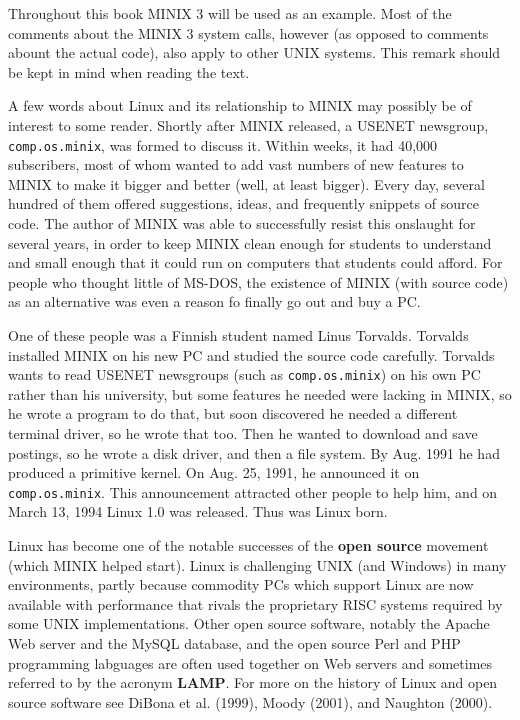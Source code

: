 \documentclass{book}
\newcommand {\kw}  [1] {\textbf{#1}}
\newcommand {\www} [1] {\texttt{#1}}
\begin{document}
Throughout this book MINIX 3 will be used as an example.
Most of the comments about the MINIX 3 system calls, however (as opposed to comments abount the actual code), also apply to other UNIX systems.
This remark should be kept in mind when reading the text.

A few words about Linux and its relationship to MINIX may possibly be of interest to some reader.
Shortly after MINIX released, a USENET newsgroup, \www{comp.os.minix}, was formed to discuss it.
Within weeks, it had 40,000 subscribers, most of whom wanted to add vast numbers of new features to MINIX 
to make it bigger and better (well, at least bigger).
Every day, several hundred of them offered suggestions, ideas, and frequently snippets of source code.
The author of MINIX was able to successfully resist this onslaught for several years, 
in order to keep MINIX clean enough for students to understand and small enough that it could run on computers that students could afford.
For people who thought little of MS-DOS, the existence of MINIX (with source code) as an alternative was even a reason fo finally go out and buy a PC.

One of these people was a Finnish student named Linus Torvalds.
Torvalds installed MINIX on his new PC and studied the source code carefully.
Torvalds wants to read USENET newsgroups (such as \www{comp.os.minix}) on his own PC rather than his university, 
but some features he needed were lacking in MINIX, so he wrote a program to do that, but soon discovered he needed a different terminal driver,
so he wrote that too.
Then he wanted to download and save postings, so he wrote a disk driver, and then a file system.
By Aug. 1991 he had produced a primitive kernel.
On Aug. 25, 1991, he announced it on \www{comp.os.minix}.
This announcement attracted other people to help him, and on March 13, 1994 Linux 1.0 was released.
Thus was Linux born.

Linux has become one of the notable successes of the \kw{open source} movement (which MINIX helped start).
Linux is challenging UNIX (and Windows) in many environments, partly because commodity PCs which support Linux are now available with performance that rivals the proprietary RISC systems required by some UNIX implementations.
Other open source software, notably the Apache Web server and the MySQL database, 
and the open source Perl and PHP programming labguages are often used together on Web servers and sometimes referred to by the acronym \kw{LAMP}.
For more on the history of Linux and open source software see DiBona et al. (1999), Moody (2001), and Naughton (2000).
\end{document}
